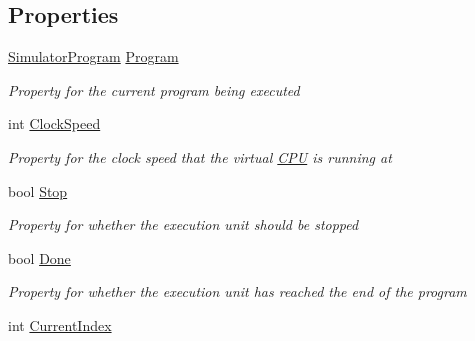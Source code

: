 \subsection*{Properties}
\begin{DoxyCompactItemize}
\item 
\hyperlink{class_c_p_u___o_s___simulator_1_1_c_p_u_1_1_simulator_program}{Simulator\+Program} \hyperlink{class_c_p_u___o_s___simulator_1_1_c_p_u_1_1_execution_unit_a5266ac137491de1efa6c4d707fcd162e}{Program}
\begin{DoxyCompactList}\small\item\em Property for the current program being executed \end{DoxyCompactList}\item 
int \hyperlink{class_c_p_u___o_s___simulator_1_1_c_p_u_1_1_execution_unit_ac34a0c232ee8d1996d29f5d8614556ab}{Clock\+Speed}
\begin{DoxyCompactList}\small\item\em Property for the clock speed that the virtual \hyperlink{namespace_c_p_u___o_s___simulator_1_1_c_p_u}{C\+P\+U} is running at \end{DoxyCompactList}\item 
bool \hyperlink{class_c_p_u___o_s___simulator_1_1_c_p_u_1_1_execution_unit_a1b8748f1c6679263e5dc03fe382ad150}{Stop}
\begin{DoxyCompactList}\small\item\em Property for whether the execution unit should be stopped \end{DoxyCompactList}\item 
bool \hyperlink{class_c_p_u___o_s___simulator_1_1_c_p_u_1_1_execution_unit_afc47977290c9bccf4f3b115613a67576}{Done}
\begin{DoxyCompactList}\small\item\em Property for whether the execution unit has reached the end of the program \end{DoxyCompactList}\item 
int \hyperlink{class_c_p_u___o_s___simulator_1_1_c_p_u_1_1_execution_unit_a14d2a23bdc679ed2758733f34f79db63}{Current\+Index}

\end{DoxyCompactItemize}
